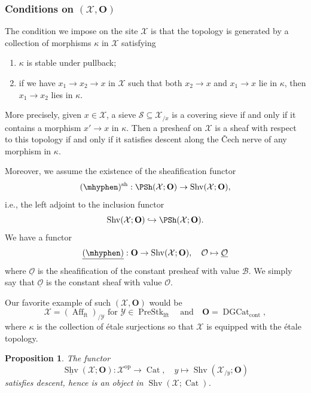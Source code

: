 \documentclass[10pt]{amsart}
\newcommand{\sssec}{\subsubsection}
\newtheorem{prop}[subsubsection]{Proposition}
\theoremstyle{remark}
\newcommand{\te}{\text}
\newcommand{\ul}{\underline}
\newcommand{\on}{\operatorname}
\newcommand{\cB}{\mathcal{B}}
\newcommand{\cO}{\mathcal{O}}
\newcommand{\cS}{\mathcal{S}}
\newcommand{\cX}{\mathcal{X}}
\newcommand{\cY}{\mathcal{Y}}
\newcommand{\Cat}{\on{Cat}}
\newcommand{\DGcat}{\on{DGCat}_{\on{cont}}}
\newcommand{\Shv}{\on{Shv}}
\newcommand{\PreStklft}{\on{PreStk}_{\on{lft}}}
\newcommand{\Affft}{\on{Aff}_{\on{ft}}}
\DeclareMathOperator{\op}{op}
\newcommand{\bO}{\mathbf{O}}
\begin{document}
\sssec{Conditions on $(\cX,\bO)$}\label{sssec: conditions on cX bO}
The condition we impose on the site $\cX$ is that the topology is generated by a collection of morphisms $\kappa$ in $\cX$ satisfying
\begin{enumerate}
    \item $\kappa$ is stable under pullback;
    \item if we have $x_1\rightarrow x_2\rightarrow x$ in $\cX$ such that both $x_2\rightarrow x$ and $x_1\rightarrow x$ lie in $\kappa$, then $x_1\rightarrow x_2$ lies in $\kappa$.
\end{enumerate}
More precisely, given $x\in\cX$, a sieve $\cS\subseteq \cX_{/x}$ is a covering sieve if and only if it contains a morphism $x'\rightarrow x$ in $\kappa$. Then a presheaf on $\cX$ is a sheaf with respect to this topology if and only if it satisfies descent along the \v{C}ech nerve of any morphism in $\kappa$.
\medskip

Moreover, we assume the existence of the sheafification functor
\begin{equation}\label{eq: sheafification functor}
    (\mhyphen)^{\on{sh}}:\PSh(\cX;\bO)\rightarrow \Shv(\cX;\bO),
\end{equation}
i.e., the left adjoint to the inclusion functor
\[\Shv(\cX;\bO)\hookrightarrow \PSh(\cX;\bO).\]
We have a functor
\begin{equation}\label{eq: constant sheaf functor}
    \ul{(\mhyphen)}:\bO\rightarrow \Shv(\cX;\bO),\quad \cO\mapsto \ul{\cO}
\end{equation}
 where $\ul{\cO}$ is the sheafification of the constant presheaf with value $\cB$. We simply say that $\ul{\cO}$ is the constant sheaf with value $\cO$.
 \medskip
 
Our favorite example of such $(\cX,\bO)$ would be
\[\cX=(\Affft)_{/\cY} \te{ for } \cY\in\PreStklft \quad\te{and}\quad \bO=\DGcat,\] where $\kappa$ is the collection of \'etale surjections so that $\cX$ is equipped with the \'etale topology.
\begin{prop}\label{prop: sheaf of sheaf categories}
    The functor
\begin{equation}
    \ul{\Shv}(\cX;\bO): \cX^{\op}\rightarrow \Cat,\quad y\mapsto \Shv(\cX_{/y};\bO)
    \end{equation}
    satisfies descent, hence is an object in $\Shv(\cX;\Cat)$.
\end{prop}
\end{document}
